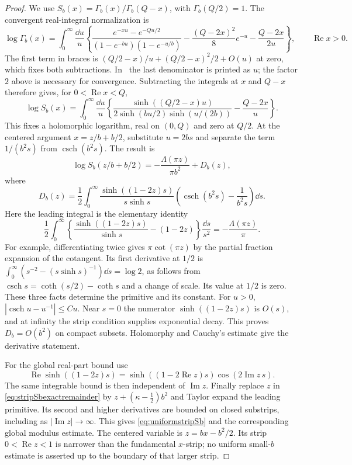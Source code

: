 \begin{proof}
We use $S_b(x)=\Gamma_b(x)/\Gamma_b(Q-x)$, with
$\Gamma_b(Q/2)=1$. The convergent real-integral normalization is
\[
 \log\Gamma_b(x)=\int_0^\infty\frac{\dd u}{u}
 \left\{
 \frac{e^{-xu}-e^{-Qu/2}}{(1-e^{-bu})(1-e^{-u/b})}
 -\frac{(Q-2x)^2}{8}e^{-u}-\frac{Q-2x}{2u}
 \right\},\qquad \operatorname{Re}x>0.
\]
The first term in braces is
$(Q/2-x)/u+(Q/2-x)^2/2+O(u)$ at zero, which fixes both
subtractions. In~\cite[arXiv version~3, (A.1)]{TeschnerVartanov}
the last denominator is printed as $u$; the factor $2$ above
is necessary for convergence. Subtracting the integrals at $x$
and $Q-x$ therefore gives, for $0<\operatorname{Re}x<Q$,
\[
 \log S_b(x)=\int_0^\infty\frac{\dd u}{u}
 \left\{
 \frac{\sinh((Q/2-x)u)}
      {2\sinh(bu/2)\sinh(u/(2b))}
 -\frac{Q-2x}{u}
 \right\}.
\]
This fixes a holomorphic logarithm, real on $(0,Q)$ and zero at
$Q/2$. At the centered argument $x=z/b+b/2$, substitute
$u=2bs$ and separate the term $1/(b^2s)$ from
$\operatorname{csch}(b^2s)$. The result is
\begin{equation}
 \log S_b(z/b+b/2)
 =-\frac{\Lambda(\pi z)}{\pi b^2}+D_b(z),
 \label{eq:stripSbexactremainder}
\end{equation}
where
\begin{equation}
 D_b(z)=\frac12\int_0^\infty
 \frac{\sinh((1-2z)s)}{s\sinh s}
 \left(\operatorname{csch}(b^2s)-\frac1{b^2s}\right)\dd s.
 \label{eq:Sbremainderintegral}
\end{equation}
Here the leading integral is the elementary identity
\[
 \frac12\int_0^\infty
 \left\{\frac{\sinh((1-2z)s)}{\sinh s}-(1-2z)\right\}
 \frac{\dd s}{s^2}=-\frac{\Lambda(\pi z)}{\pi}.
\]
For example, differentiating twice gives $\pi\cot(\pi z)$
by the partial fraction expansion of the cotangent. Its first
derivative at $1/2$ is
$\int_0^\infty(s^{-2}-(s\sinh s)^{-1})\dd s=\log2$,
as follows from $\operatorname{csch}s=\coth(s/2)-\coth s$
and a change of scale. Its value at $1/2$ is zero. These three
facts determine the primitive and its constant.
For $u>0$,
$|\operatorname{csch}u-u^{-1}|\le C u$.
Near $s=0$ the numerator $\sinh((1-2z)s)$ is $O(s)$,
and at infinity the strip condition supplies exponential decay.
This proves $D_b=O(b^2)$ on compact subsets. Holomorphy and
Cauchy's estimate give the derivative statement.

For the global real-part bound use
\[
 \operatorname{Re}\sinh((1-2z)s)
 =\sinh((1-2\operatorname{Re}z)s)
       \cos(2\operatorname{Im}z\,s).
 \]
The same integrable bound is then independent of
$\operatorname{Im}z$. Finally replace $z$ in
\eqref{eq:stripSbexactremainder} by
$z+(\kappa-\frac12)b^2$ and Taylor expand the leading
primitive. Its second and higher derivatives are bounded on
closed substrips, including as $|\operatorname{Im}z|\to\infty$.
This gives \eqref{eq:uniformstripSb} and the corresponding
global modulus estimate.
The centered variable is $z=bx-b^2/2$. Its strip
$0<\operatorname{Re}z<1$ is narrower than the fundamental
$x$-strip; no uniform small-$b$ estimate is asserted up to the
boundary of that larger strip.
\end{proof}

